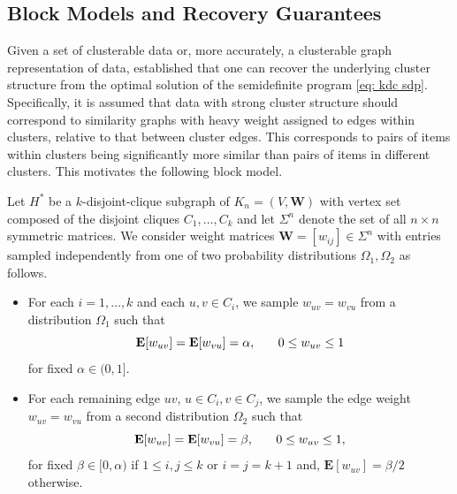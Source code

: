 \documentclass[twoside,11pt]{article}
\newcommand{\E}{\mathbf{E}}
\newcommand{\bs}{\boldsymbol}
\newcommand{\W}{\bs {W}}
\newcommand{\0}{\bs{0}}
\newcommand{\eq}[1]{\(#1\)}
\begin{document}
{\subsection{Block Models and Recovery Guarantees}
\label{sec: rec}
Given a set of {clusterable} data or, more accurately, a {clusterable} graph representation of data, \cite{ames2014guaranteed} established that one can recover the underlying cluster structure from the optimal solution of the semidefinite program \eqref{eq: kdc sdp}.
Specifically, it is assumed that data with strong cluster structure should correspond to similarity graphs
with heavy weight assigned to edges within clusters, relative to that between cluster edges.
This corresponds to pairs of items within clusters being significantly more similar than pairs of items in
different clusters. This motivates the following block model.

Let \(H^*\) be a \(k\)-disjoint-clique subgraph of \(K_n = (V,\W)\) with vertex set composed
of the disjoint cliques \(C_1, \dots, C_k\) and
let \(\Sigma^n\) denote the set of all \(n\times n\) symmetric matrices.
We consider weight matrices \(\W = [w_{ij}] \in \Sigma^n\)
with entries sampled independently from one of two probability distributions \(\Omega_1, \Omega_2\)
as follows. %
\begin{itemize}
	\item
	For each \(i=1, \dots, k\) and each \(u,v \in C_i\),
	we sample \(w_{uv} = w_{vu}\) from a distribution \(\Omega_1\) such that
	\[
	\E[w_{uv}] = \E [w_{vu}] = \alpha, \hspace{0.25in} 0 \le w_{uv} \le 1
	\]
	for fixed \(\alpha \in (0,1]\).
	\item
	For each remaining 	edge \(uv\),
	\eq{u\in C_i, v \in C_j}, we sample the edge weight \(w_{uv} = w_{vu}\)
	from a second distribution \(\Omega_2\) such that
	\[
	\E[w_{uv}]  = \E[w_{vu}] = \beta, \hspace{0.25in} 0 \le w_{uv} \le 1,
	\]
	for fixed \(\beta \in [0, \alpha) \)
	if ${1 \le i, j \le k}$ or $i=j = k+1$
	and, \(\E[w_{uv}] = \beta/2\) otherwise.
\end{itemize}

}
\end{document}
